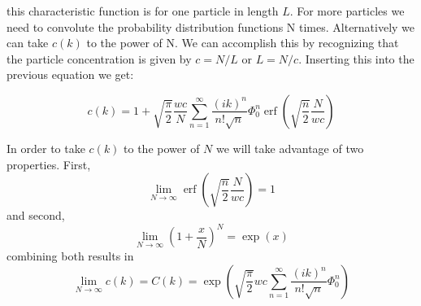 \documentclass[%
 reprint,
 amsmath,amssymb,
 aps,
]{revtex4-1}
\DeclareMathOperator\erf{erf}
\begin{document}
this characteristic function is for one particle in length $L$.  For more particles we need to convolute the probability distribution functions N times.  Alternatively we can take $c(k)$ to the power of N.  We can accomplish this by recognizing that the particle concentration is given by $c=N/L$ or $L=N/c$.  Inserting this into the previous equation we get:

\begin{equation}
	c(k) = 1+\sqrt{\frac{\pi}{2}}\frac{wc}{N}\sum_{n=1}^{\infty}\frac{(ik)^{n}}{n!\sqrt{n}}\Phi_{0}^{n} \erf{\left(\sqrt{\frac{n}{2}}\frac{N}{wc}\right)}
\end{equation}

In order to take $c(k)$ to the power of $N$ we will take advantage of two properties.  First,
\begin{equation}
\lim_{N\rightarrow \infty}\erf{\left(\sqrt{\frac{n}{2}}\frac{N}{wc}\right)} = 1
\end{equation}
and second,
\begin{equation}
\lim_{N\rightarrow \infty}\left(1+\frac{x}{N}\right)^{N} = \exp(x)
\end{equation}
combining both results in
\begin{equation}
	\lim_{N\rightarrow \infty}c(k) = C(k) = \exp\left(\sqrt{\frac{\pi}{2}}wc\sum_{n=1}^{\infty}\frac{(ik)^{n}}{n!\sqrt{n}}\Phi_{0}^{n} \right)
\end{equation}
\end{document}
